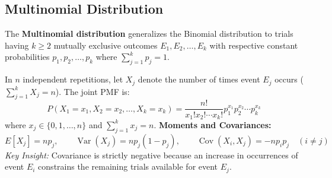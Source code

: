 \documentclass[12pt,a4paper]{article}
\begin{document}
\subsection{Multinomial Distribution}
The \textbf{Multinomial distribution} generalizes the Binomial distribution to trials having $k \ge 2$ mutually exclusive outcomes $E_1, E_2, \dots, E_k$ with respective constant probabilities $p_1, p_2, \dots, p_k$ where $\sum_{j=1}^k p_j = 1$.
\begin{tcolorbox}[defbox, title={\textbf{Definition: Multinomial PMF}}]
In $n$ independent repetitions, let $X_j$ denote the number of times event $E_j$ occurs ($\sum_{j=1}^k X_j = n$). The joint PMF is:
\begin{equation}
  P(X_1 = x_1, X_2 = x_2, \dots, X_k = x_k) = \frac{n!}{x_1! x_2! \cdots x_k!} p_1^{x_1} p_2^{x_2} \cdots p_k^{x_k}
\end{equation}
where $x_j \in \{0, 1, \dots, n\}$ and $\sum_{j=1}^k x_j = n$.
\textbf{Moments and Covariances:}
\begin{equation}
  E[X_j] = n p_j, \qquad \operatorname{Var}(X_j) = n p_j (1 - p_j), \qquad \operatorname{Cov}(X_i, X_j) = -n p_i p_j \quad (i \ne j)
\end{equation}
\textit{Key Insight:} Covariance is strictly negative because an increase in occurrences of event $E_i$ constrains the remaining trials available for event $E_j$.
\end{tcolorbox}
\end{document}
